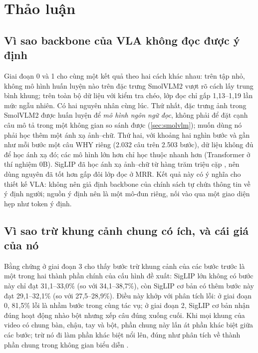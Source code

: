 \documentclass[a4paper,oneside]{report}
\begin{document}

\section{Thảo luận}
\label{sec:discussion}

\subsection{Vì sao backbone của VLA không đọc được ý định}

Giai đoạn 0 và 1 cho cùng một kết quả theo hai cách khác nhau: trên tập nhỏ, không mô hình huấn luyện nào trên đặc trưng SmolVLM2 vượt rõ cách lấy trung bình khung; trên toàn bộ dữ liệu với kiểm tra chéo, lớp đọc chỉ gấp 1,13--1,19 lần mức ngẫu nhiên. Có hai nguyên nhân cùng lúc. Thứ nhất, đặc trưng ảnh trong SmolVLM2 được huấn luyện để \textit{mô hình ngôn ngữ đọc}, không phải để đặt cạnh câu mô tả trong một không gian so sánh được (\cref{sec:smolvlm}); muốn dùng nó phải học thêm một ánh xạ ảnh--chữ. Thứ hai, với khoảng hai nghìn bước và gần như mỗi bước một câu WHY riêng (2.032 câu trên 2.503 bước), dữ liệu không đủ để học ánh xạ đó; các mô hình lớn hơn chỉ học thuộc nhanh hơn (Transformer ở thí nghiệm 0B). SigLIP đã học ánh xạ ảnh--chữ từ hàng trăm triệu cặp \citep{zhai2023siglip}, nên dùng nguyên đã tốt hơn gấp đôi lớp đọc ở MRR. Kết quả này có ý nghĩa cho thiết kế VLA: không nên giả định backbone của chính sách tự chứa thông tin về ý định người; nguồn ý định nên là một mô-đun riêng, nối vào qua một giao diện hẹp như token ý định.

\subsection{Vì sao trừ khung cảnh chung có ích, và cái giá của nó}

Bằng chứng ở giai đoạn 3 cho thấy bước trừ khung cảnh của các bước trước là một trong hai thành phần chính của cấu hình đề xuất: SigLIP lớn không có bước này chỉ đạt 31,1--33,0\% (so với 34,1--38,7\%), còn SigLIP cơ bản có thêm bước này đạt 29,1--32,1\% (so với 27,5--28,9\%). Điều này khớp với phân tích lỗi: ở giai đoạn 0, 81,5\% lỗi là nhầm bước trong cùng tác vụ; ở giai đoạn 2, SigLIP cơ bản nhận đúng hoạt động nhào bột nhưng xếp câu đúng xuống cuối. Khi mọi khung của video có chung bàn, chậu, tay và bột, phần chung này lấn át phần khác biệt giữa các bước; trừ nó đi làm phần khác biệt nổi lên, đúng như phân tích về thành phần chung trong không gian biểu diễn \citep{liang2022mindgap}.
\end{document}
